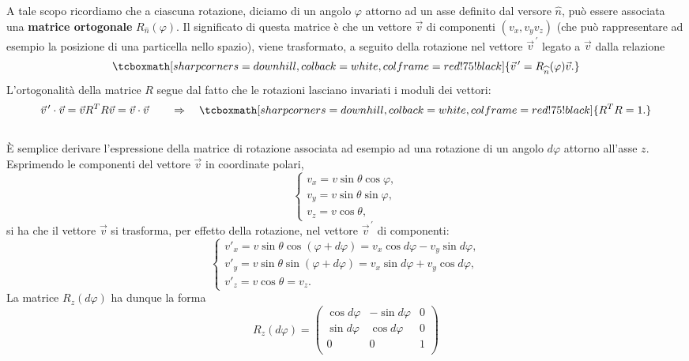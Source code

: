 A tale scopo ricordiamo che a ciascuna rotazione, diciamo di un angolo $\varphi$ attorno ad un asse definito dal versore $\widehat{n}$, può essere associata una \textbf{matrice ortogonale} $R_{\widehat{n}} (\varphi)$. Il significato di questa matrice è che un vettore $\vec{v}$ di componenti $(v_x, v_y v_z) $ (che può rappresentare ad esempio la posizione di una particella nello spazio), viene trasformato, a seguito della rotazione nel vettore $\vec{v}^{\, \prime}$ legato a $\vec{v}$ dalla relazione
	\begin{equation}
		\tcboxmath[sharp corners=downhill, colback=white, colframe=red!75!black]{
			\vec{v}^{\, \prime}= R_{\widehat{n}} (\varphi)\vec{v}.
			}
	\end{equation}
L'ortogonalità della matrice $R$ segue dal fatto che le rotazioni lasciano invariati i moduli dei vettori:
	\begin{equation}
		\vec{v}^{\, \prime}\cdot\vec{v} = \vec{v}R^T R \vec{v}= \vec{v}\cdot\vec{v} \qquad \Rightarrow \quad
		\tcboxmath[sharp corners=downhill, colback=white, colframe=red!75!black]{
 		R^T R =1.
 		}
	\end{equation}\\
	
È semplice derivare l'espressione della matrice di rotazione associata ad esempio ad una rotazione di un angolo $d\varphi $ attorno all'asse $z$. Esprimendo le componenti del vettore $\vec{v}$ in coordinate polari,
	\begin{equation}
		\begin{cases}
			v_x = v \sin\theta \cos \varphi ,\\
			v_y = v \sin\theta \sin \varphi ,\\
			v_z = v \cos\theta ,
		\end{cases}
	\end{equation}
si ha che il vettore $\vec{v}$ si trasforma, per effetto della rotazione, nel vettore $\vec{v}^{\, \prime}$ di componenti:
	\begin{equation}
		\begin{cases}
			v'_x = v \sin\theta \cos (\varphi +d\varphi )= v_x \cos d\varphi - v_y \sin d\varphi ,\\
			v'_y = v \sin\theta \sin (\varphi +d\varphi ) = v_x \sin d\varphi + v_y \cos d\varphi ,\\
			v'_z = v \cos\theta = v_z .
	\end{cases}
	\end{equation}
La matrice $R_z (d\varphi)$ ha dunque la forma
	\begin{equation}
		R_z (d\varphi)=
		\begin{pmatrix}
			\cos d\varphi & -\sin d\varphi & 0\\
			\sin d\varphi & \cos d\varphi & 0 \\
			0 & 0 & 1 \\
		\end{pmatrix}
	\end{equation}\\
	
